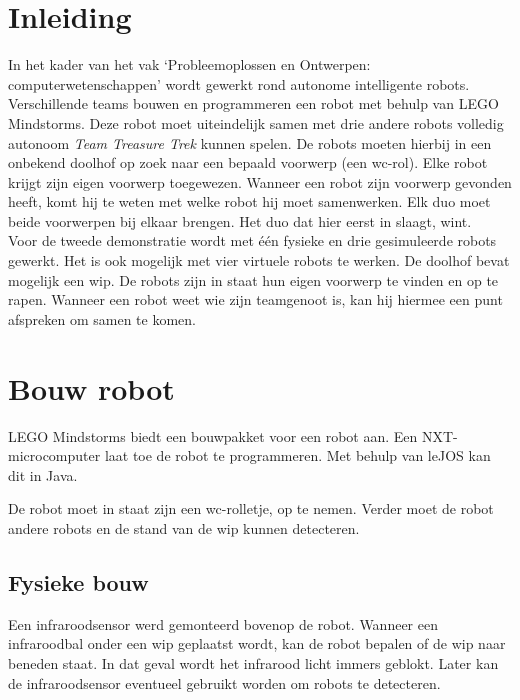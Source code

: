 \documentclass[tt2]{penoverslag}
\begin{document}
\newpage


\section{Inleiding} %
\label{ssec:inl}
In het kader van het vak `Probleemoplossen en Ontwerpen: computerwetenschappen' wordt gewerkt rond autonome intelligente robots. Verschillende teams bouwen en programmeren een robot met behulp van LEGO Mindstorms. Deze robot moet uiteindelijk samen met drie andere robots volledig autonoom \textit{Team Treasure Trek} kunnen spelen.
De robots moeten hierbij in een onbekend doolhof op zoek naar een bepaald voorwerp (een wc-rol). Elke robot krijgt zijn eigen voorwerp toegewezen. Wanneer een robot zijn voorwerp gevonden heeft, komt hij te weten met welke robot hij moet samenwerken. Elk duo moet beide voorwerpen bij elkaar brengen. Het duo dat hier eerst in slaagt, wint.\\

Voor de tweede demonstratie wordt met \'e\'en fysieke en drie gesimuleerde robots gewerkt. Het is ook mogelijk met vier virtuele robots te werken. De doolhof bevat mogelijk een wip. De robots zijn in staat hun eigen voorwerp te vinden en op te rapen. Wanneer een robot weet wie zijn teamgenoot is, kan hij hiermee een punt afspreken om samen te komen.\\


\section{Bouw robot}
\label{ssec:bouwrob}
LEGO Mindstorms  biedt een bouwpakket voor een robot aan. Een NXT-microcomputer laat toe de robot te programmeren. Met behulp van leJOS  kan dit in Java.

De robot moet in staat zijn een wc-rolletje, op te nemen. Verder moet de robot andere robots en de stand van de wip kunnen detecteren.

\subsection{Fysieke bouw}
\label{ssec:fysb}
Een infraroodsensor werd gemonteerd bovenop de robot. Wanneer een infraroodbal onder een wip geplaatst wordt, kan de robot bepalen of de wip naar beneden staat. In dat geval wordt het infrarood licht immers geblokt. Later kan de infraroodsensor eventueel gebruikt worden om robots te detecteren.\\
\end{document}
